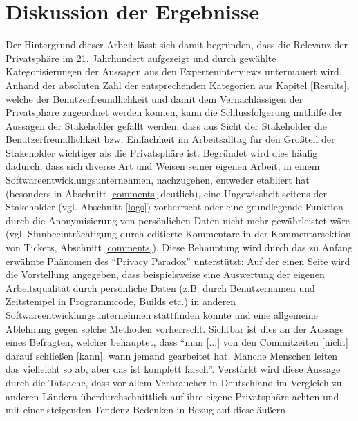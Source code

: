 \chapter{Diskussion der Ergebnisse} %
\label{Discussion} %
Der Hintergrund dieser Arbeit lässt sich damit begründen, dass die Relevanz der Privatsphäre im 21. Jahrhundert aufgezeigt und durch gewählte Kategorisierungen der Aussagen aus den
Experteninterviews untermauert wird. Anhand der absoluten Zahl der entsprechenden Kategorien aus Kapitel \ref{Results}, welche der Benutzerfreundlichkeit und damit dem Vernachlässigen der
Privatsphäre zugeordnet werden können, kann die Schlussfolgerung mithilfe der Aussagen der Stakeholder gefällt werden, dass aus Sicht der Stakeholder die Benutzerfreundlichkeit bzw. Einfachheit
im Arbeitsalltag für den Großteil der Stakeholder wichtiger als die Privatsphäre ist. Begründet wird dies häufig dadurch, dass sich diverse Art und Weisen seiner eigenen Arbeit, in einem Softwareentwicklungsunternehmen,
nachzugehen, entweder etabliert hat (besonders in Abschnitt \ref{comments} deutlich), eine Ungewissheit seitens der Stakeholder (vgl. Abschnitt \ref{logs}) vorherrscht oder eine grundlegende Funktion durch die Anonymisierung
von persönlichen Daten nicht mehr gewährleistet wäre (vgl. Sinnbeeinträchtigung durch editierte Kommentare in der Kommentarsektion von Tickets, Abschnitt \ref{comments}). \newline
Diese Behauptung wird durch das zu Anfang erwähnte Phänomen des \enquote{Privacy Paradox} unterstützt: Auf der einen Seite wird die Vorstellung angegeben, dass beispielsweise eine Auswertung der eigenen Arbeitsqualität 
durch persönliche Daten (z.B. durch Benutzernamen und Zeitstempel in Programmcode, Builds etc.) in anderen Softwareentwicklungsunternehmen stattfinden könnte und eine allgemeine Ablehnung gegen solche Methoden vorherrscht. Sichtbar ist dies
an der Aussage eines Befragten, welcher behauptet, dass \enquote{man [...] von den Commitzeiten [nicht] darauf schließen [kann], wann jemand gearbeitet hat. Manche Menschen leiten das vielleicht so ab, aber das ist komplett falsch}. Verstärkt wird diese Aussage durch die Tatsache, dass vor allem Verbraucher in Deutschland im Vergleich zu anderen Ländern überdurchschnittlich auf ihre eigene Privatsphäre achten \cite{IfH:2015aa} und mit einer steigenden Tendenz
Bedenken in Bezug auf diese äußern \cite{Bansal:2016aa}. \newline
